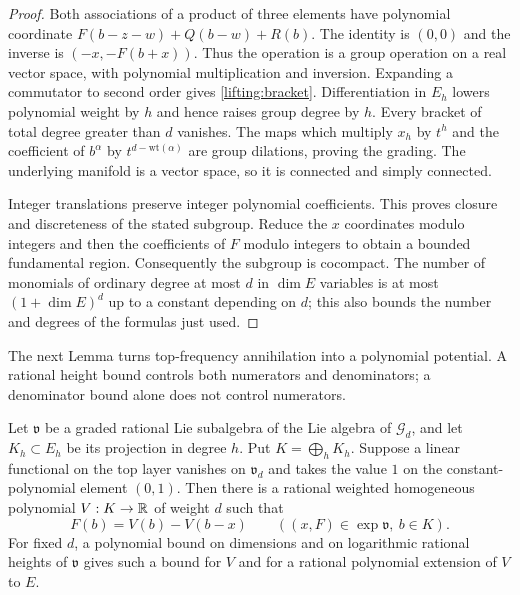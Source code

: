 \begin{proof}
Both associations of a product of three elements have polynomial
coordinate
$F(b-z-w)+Q(b-w)+R(b)$.
The identity is $(0,0)$ and the inverse is
$(-x,-F(b+x))$.  Thus the operation is a group operation on a real
vector space, with polynomial multiplication and inversion.
Expanding a commutator to second order gives
\eqref{lifting:bracket}.  Differentiation in $E_h$ lowers polynomial
weight by $h$ and hence raises group degree by $h$.
Every bracket of total degree greater than $d$ vanishes.  The maps
which multiply $x_h$ by $t^h$ and the coefficient of $b^\alpha$ by
$t^{d-\mathrm{wt}(\alpha)}$ are group dilations, proving the grading.
The underlying manifold is a vector space, so it is connected and
simply connected.

Integer translations preserve integer polynomial coefficients.  This
proves closure and discreteness of the stated subgroup.  Reduce the
$x$ coordinates modulo integers and then the coefficients of $F$
modulo integers to obtain a bounded fundamental region.  Consequently
the subgroup is cocompact.  The number of monomials of ordinary degree
at most $d$ in $\dim E$ variables is at most $(1+\dim E)^d$ up to a
constant depending on $d$; this also bounds the number and degrees of
the formulas just used.
\end{proof}

The next Lemma turns top-frequency annihilation into a polynomial
potential.  A rational height bound controls both numerators and
denominators; a denominator bound alone does not control numerators.

\begin{lemma}
\label{lifting:potential}
Let $\mathfrak v$ be a graded rational Lie subalgebra of the Lie algebra
of $\mathscr G_d$, and let $K_h\subset E_h$ be its projection in degree
$h$.  Put $K=\bigoplus_hK_h$.  Suppose a linear functional on the top
layer vanishes on $\mathfrak v_d$ and takes the value $1$ on the
constant-polynomial element $(0,1)$.  Then there is a rational weighted
homogeneous polynomial $V:K\to\mathbb R$ of weight $d$ such that
\begin{equation}
 F(b)=V(b)-V(b-x)\qquad
 ((x,F)\in\exp\mathfrak v,\ b\in K).
 \label{lifting:potential-identity}
\end{equation}
For fixed $d$, a polynomial bound on dimensions and on logarithmic
rational heights of $\mathfrak v$ gives such a bound for $V$ and for a
rational polynomial extension of $V$ to $E$.
\end{lemma}

